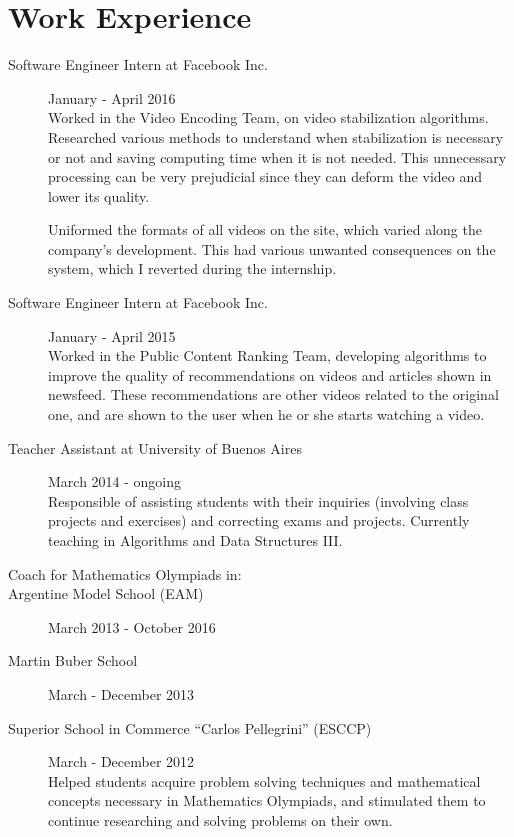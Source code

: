 \documentclass [a4paper, 11pt]{article}
\newcommand{\tabu}{\hspace*{0.7cm}}
\begin{document}
\section* {Work Experience}

\begin{description}
  \item[Software Engineer Intern at Facebook Inc.] {\hfill January - April 2016\\
  Worked in the Video Encoding Team, on video stabilization algorithms. Researched various methods to understand when stabilization is necessary or not and saving computing time when it is not needed. This unnecessary processing can be very prejudicial since they can deform the video and lower its quality.

Uniformed the formats of all videos on the site, which varied along the company's development. This had various unwanted consequences on
the system, which I reverted during the internship.
}

  \item[Software Engineer Intern at Facebook Inc.] {\hfill January - April 2015\\
Worked in the Public Content Ranking Team, developing algorithms to improve the quality of recommendations on videos and articles shown in newsfeed. These recommendations are other videos related to the original one, and are shown to the user when he or she starts watching a video.
}

  \item[Teacher Assistant at University of Buenos Aires] {\hfill March 2014 - ongoing\\
  Responsible of assisting students with their inquiries (involving class projects and 
  exercises) and correcting exams and projects. Currently teaching in Algorithms 
  and Data Structures III.\\
}
\item[Coach for Mathematics Olympiads in:]
\item[\tabu Argentine Model School (EAM)] {\hfill March 2013 - October 2016}
\item[\tabu Martin Buber School] {\hfill March - December 2013}
\item[\tabu Superior School in Commerce ``Carlos Pellegrini'' (ESCCP)] { \hfill March - December 2012 \\
Helped students acquire problem solving techniques and mathematical concepts necessary in Mathematics Olympiads, and stimulated them to continue researching and solving problems on their own.
	}

\end{description}
\end{document}
